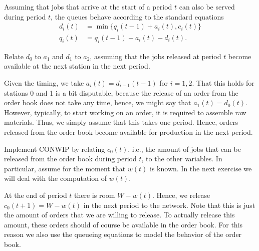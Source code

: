 Assuming that jobs that arrive at the start of a period $t$ can also be served during period $t$, the queues behave according to the standard equations
\begin{align*}
  d_i(t) &= \min\{q_i(t-1) + a_i(t), c_i(t)\} \\
  q_i(t) &= q_i(t-1) + a_i(t) - d_i(t).
\end{align*}


\begin{exercise} Relate $d_0$ to $a_1$ and $d_1$ to $a_2$, assuming that the jobs released at period $t$ become available at the next station in the next period.
  \begin{solution}
    Given the timing, we take $a_i(t) = d_{i-1}(t-1)$ for $i=1,2$.
    That this holds for stations 0 and 1 is a bit disputable, because the release of an order from the order book does not take any time, hence, we might say that $a_1(t) = d_0(t)$.
    However, typically, to start working on an order, it is required to assemble raw materials.
    Thus, we simply assume that this takes one period.
    Hence, orders released from the order book become available for production in the next period.
  \end{solution}
\end{exercise}

\begin{exercise}
  Implement CONWIP by relating $c_0(t)$, i.e., the amount of jobs that can be released from the order book during period $t$, to the other variables.
  In particular, assume for the moment that $w(t)$ is known.
  In the next exercise we will deal with the computation of $w(t)$.
  \begin{solution}
    At the end of period $t$ there is room $W-w(t)$.
    Hence, we release $c_0(t+1) = W-w(t)$ in the next period to the network.
    Note that this is just the amount of orders that we are willing to release.
    To actually release this amount, these orders should of course be available in the order book.
    For this reason we also use the queueing equations to model the behavior of the order book.
  \end{solution}
\end{exercise}


